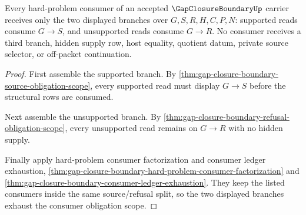 \begin{theorem}
\label{thm:gap-closure-boundary-consumer-obligation-scope}
Every hard-problem consumer of an accepted $\GapClosureBoundaryUp$ carrier receives only the two displayed branches over $G,S,R,H,C,P,N$: supported reads consume $G \longrightarrow S$, and unsupported reads consume $G \longrightarrow R$. No consumer receives a third branch, hidden supply row, host equality, quotient datum, private source selector, or off-packet continuation.
\end{theorem}
\begin{proof}
First assemble the supported branch. By \autoref{thm:gap-closure-boundary-source-obligation-scope}, every supported read must display $G \longrightarrow S$ before the structural rows are consumed.

Next assemble the unsupported branch. By \autoref{thm:gap-closure-boundary-refusal-obligation-scope}, every unsupported read remains on $G \longrightarrow R$ with no hidden supply.

Finally apply hard-problem consumer factorization and consumer ledger exhaustion, \autoref{thm:gap-closure-boundary-hard-problem-consumer-factorization} and \autoref{thm:gap-closure-boundary-consumer-ledger-exhaustion}. They keep the listed consumers inside the same source/refusal split, so the two displayed branches exhaust the consumer obligation scope.
\end{proof}
